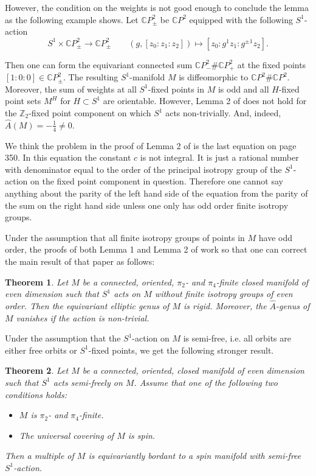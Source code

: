 \documentclass[a4paper, 11pt]{amsart}
\newtheorem{theorem}{Theorem}[section]
\theoremstyle{definition}
\theoremstyle{remark}
\numberwithin{equation}{section}
\begin{document}
However, the condition on the weights is not good enough to conclude the lemma as the following example shows.
Let \(\mathbb{C}P^2_\pm\) be \(\mathbb{C}P^2\) equipped with the following \(S^1\)-action
\[S^1\times \mathbb{C} P_\pm^2\rightarrow \mathbb{C}P_\pm^2\quad \quad (g,[z_0:z_1:z_2])\mapsto [z_0:g^1 z_1:g^{\pm 1} z_2].\] 

Then one can form the equivariant connected sum \(\mathbb{C}P^2_-\#\mathbb{C}P^2_+\) at the fixed points \([1:0:0]\in \mathbb{C} P^2_\pm\).
The resulting \(S^1\)-manifold \(M\) is diffeomorphic to \(\mathbb{C} P^2\#\mathbb{C} P^2\).
Moreover, the sum of weights at all \(S^1\)-fixed points in \(M\) is odd and all \(H\)-fixed point sets \(M^H\) for \(H\subset S^1\) are orientable.
However, Lemma 2 of \cite{MR1979364} does not hold for the \(\mathbb{Z}_2\)-fixed point component on which \(S^1\) acts non-trivially. And, indeed, \(\hat{A}(M)= -\frac{1}{4}\neq 0\).

We think the problem in the proof of Lemma 2 of \cite{MR1979364} is the last equation on page 350.
In this equation the constant \(c\) is not integral.
It is just a rational number with denominator equal to the order of the principal isotropy group of the \(S^1\)-action on the fixed point component in question.
Therefore one cannot say anything about the parity of the left hand side of the equation from the parity of the sum on the right hand side unless one only has odd order finite isotropy groups.

Under the assumption that all finite isotropy groups of points in \(M\) have odd order, the proofs of both Lemma 1 and Lemma 2 of \cite{MR1979364} work so that one can correct the main result of that paper as follows:

\begin{theorem}
  \label{sec:another-example-1}
  Let \(M\) be a connected, oriented, \(\pi_2\)- and \(\pi_4\)-finite closed manifold of even dimension such that \(S^1\) acts on \(M\) without finite isotropy groups of even order.
  Then the equivariant elliptic genus of \(M\) is rigid. Moreover, the \(\hat{A}\)-genus of \(M\) vanishes if the action is non-trivial.
\end{theorem}

Under the assumption that the \(S^1\)-action on \(M\) is semi-free, i.e. all orbits are either free orbits or \(S^1\)-fixed points, we get the following stronger result.


\begin{theorem}
  Let \(M\) be a connected, oriented, closed manifold of even dimension such that \(S^1\) acts semi-freely on \(M\).
  Assume that one of the following two conditions holds:
  \begin{itemize}
  \item \(M\) is \(\pi_2\)- and \(\pi_4\)-finite.
  \item The universal covering of \(M\) is spin.
  \end{itemize}
  Then a multiple of \(M\) is equivariantly bordant to a spin manifold with semi-free \(S^1\)-action.
\end{theorem}
\end{document}
